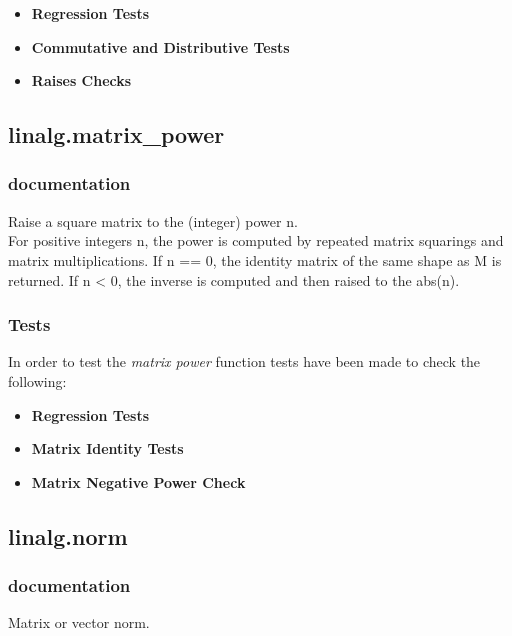 \documentclass[a4paper,11pt]{article}
\begin{document}
\begin{itemize}
	\item \textbf{Regression Tests}
	\item \textbf{Commutative and Distributive Tests}
	\item \textbf{Raises Checks}
\end{itemize}


\subsection{linalg.matrix\_power}
\subsubsection{documentation}
Raise a square matrix to the (integer) power n.\\

For positive integers n, the power is computed by repeated matrix squarings and matrix multiplications. If n == 0, the identity matrix of the same shape as M is returned. If n < 0, the inverse is computed and then raised to the abs(n).
\subsubsection{Tests}
In order to test the \textit{matrix power} function tests have been made to check the following:

\begin{itemize}
	\item \textbf{Regression Tests}
	\item \textbf{Matrix Identity Tests}
	\item \textbf{Matrix Negative Power Check}
\end{itemize}



\subsection{linalg.norm}
\subsubsection{documentation}
Matrix or vector norm.
\end{document}
